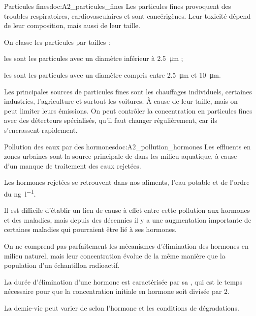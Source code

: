 \begin{doc}{Particules fines}{doc:A2_particules_fines}
  Les particules fines provoquent des troubles respiratoires, cardiovasculaires et sont cancérigènes.
  Leur toxicité dépend de leur composition, mais aussi de leur taille. 

  \begin{encart}
    On classe les particules par tailles :
    \begin{listePoints}
      \item les  sont les particules avec un diamètre inférieur à \qty{2,5}{\micro\m} ;
      \item les  sont les particules avec un diamètre compris entre \qty{2,5}{\micro\m} et \qty{10}{\micro\m}.
    \end{listePoints}
  \end{encart}

  Les principales sources de particules fines sont les chauffages individuels, certaines industries, l'agriculture et surtout les voitures.
  À cause de leur taille,  mais on peut limiter leurs émissions.
  On peut contrôler la concentration en particules fines avec des détecteurs spécialisés, qu'il faut changer régulièrement, car ils s'encrassent rapidement.
\end{doc}

\begin{doc}{Pollution des eaux par des hormones}{doc:A2_pollution_hormones}
  Les effluents en zones urbaines sont la source principale de  dans les milieu aquatique, à cause d'un manque de traitement des eaux rejetées.

  \begin{encart}
    Les hormones rejetées se retrouvent dans nos aliments, l'eau potable et  de l'ordre du \unit{\nano\g\per\litre}.
  \end{encart}
  Il est difficile d'établir un lien de cause à effet entre cette pollution aux hormones et des maladies, mais depuis des décennies il y a une augmentation importante de certaines maladies qui pourraient être lié à ses hormones.

  On ne comprend pas parfaitement les mécanismes d'élimination des hormones en milieu naturel, mais leur concentration évolue de la même manière que la population d'un échantillon radioactif.
  \begin{encart}
    La durée d'élimination d'une hormone est caractérisée par sa , qui est le temps nécessaire pour que la concentration initiale en hormone soit divisée par 2.
  \end{encart}
  
  La demie-vie peut varier de  selon l'hormone et les conditions de dégradations.
\end{doc}

